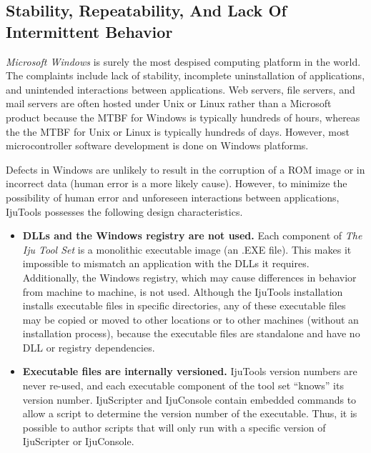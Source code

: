 \subsection{Stability, Repeatability, And Lack Of Intermittent Behavior}

\emph{Microsoft Windows}
is surely the most despised computing
platform in the world.  The complaints include
lack of stability, incomplete uninstallation of
applications, and unintended interactions between
applications.   Web servers, 
file servers, and mail
servers are often hosted under Unix or Linux
rather than a Microsoft product because
the MTBF for Windows is typically hundreds of hours, whereas the the MTBF
for Unix or Linux is typically hundreds of days.  However, most microcontroller 
software development is done on Windows platforms.

Defects in Windows are unlikely to result
in the corruption of a ROM image or in incorrect data (human error is 
a more likely cause).  However, to minimize the possibility of human error and
unforeseen interactions between applications, IjuTools possesses the following design 
characteristics.

\begin{itemize}

\item \textbf{DLLs and the Windows registry are not used.}  
      Each component of \emph{The Iju Tool Set} is a monolithic
      executable image (an .EXE file).  This makes it impossible 
      to mismatch an application
      with the DLLs it requires.  Additionally, the Windows registry,
      which may cause differences in behavior from machine to machine,
      is not used.  Although the IjuTools installation installs executable
      files in specific directories, any of these executable files may be copied
      or moved to other locations or to other machines (without an installation process),
      because the executable files are standalone and have no DLL or registry
      dependencies.

\item \textbf{Executable files are internally versioned.}  
      IjuTools version numbers are never re-used, and each executable component
      of the tool set ``knows'' its version number.  IjuScripter and IjuConsole
      contain embedded commands to allow a script to determine the version number of 
      the executable.  Thus, it is possible to author scripts that will only run
      with a specific version of IjuScripter or IjuConsole.

\end{itemize}

